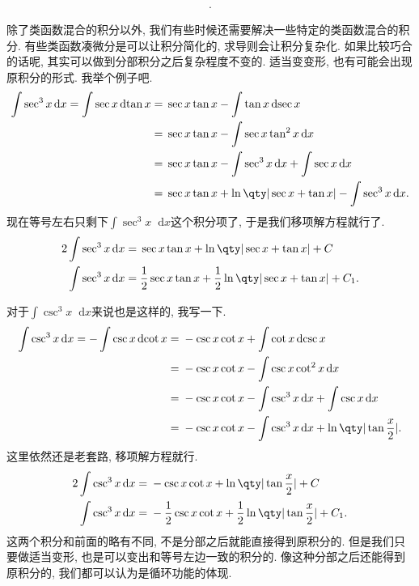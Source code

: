 \documentclass{ctexbook}
\newcommand*{\dif}{\mathop{}\!\mathrm{d}}
\begin{document}
{\begin{align*}
.\end{align*}\par
除了\uppercase\expandafter{}类函数混合的积分以外, 我们有些时候还需要解决一些特定的\uppercase\expandafter{}类函数混合的积分. 有些\uppercase\expandafter{}类函数凑微分是可以让积分简化的, 求导则会让积分复杂化. 如果比较巧合的话呢, 其实可以做到分部积分之后复杂程度不变的. 适当变变形, 也有可能会出现原积分的形式. 我举个例子吧. 
\begin{align*}
\int\sec^{3}{x}\dif{x}=\int\sec{x}\dif{\tan{x}}={}&\sec{x}\tan{x}-\int\tan{x}\dif{\sec{x}}\\
={}&\sec{x}\tan{x}-\int\sec{x}\tan^{2}{x}\dif{x}\\
={}&\sec{x}\tan{x}-\int\sec^{3}{x}\dif{x}+\int\sec{x}\dif{x}\\
={}&\sec{x}\tan{x}+\ln\qty|\sec{x}+\tan{x}|-\int\sec^{3}{x}\dif{x}
.\end{align*}
现在等号左右只剩下$\int\sec^{3}{x}\dif{x}$这个积分项了, 于是我们移项解方程就行了. 
\begin{align*}
2\int\sec^{3}{x}\dif{x}={}&\sec{x}\tan{x}+\ln\qty|\sec{x}+\tan{x}|+C\\
\int\sec^{3}{x}\dif{x}={}&\frac{1}{2}\sec{x}\tan{x}+\frac{1}{2}\ln\qty|\sec{x}+\tan{x}|+C_{1}
.\end{align*}\par
对于$\int\csc^{3}{x}\dif{x}$来说也是这样的, 我写一下. 
\begin{align*}
\int\csc^{3}{x}\dif{x}=-\int\csc{x}\dif{\cot{x}}={}&-\csc{x}\cot{x}+\int\cot{x}\dif{\csc{x}}\\
={}&-\csc{x}\cot{x}-\int\csc{x}\cot^{2}{x}\dif{x}\\
={}&-\csc{x}\cot{x}-\int\csc^{3}{x}\dif{x}+\int\csc{x}\dif{x}\\
={}&-\csc{x}\cot{x}-\int\csc^{3}{x}\dif{x}+\ln\qty|\tan{\frac{x}{2}}|
.\end{align*}
这里依然还是老套路, 移项解方程就行. 
\begin{align*}
2\int\csc^{3}{x}\dif{x}={}&-\csc{x}\cot{x}+\ln\qty|\tan{\frac{x}{2}}|+C\\
\int\csc^{3}{x}\dif{x}={}&-\frac{1}{2}\csc{x}\cot{x}+\frac{1}{2}\ln\qty|\tan{\frac{x}{2}}|+C_{1}
.\end{align*}
这两个积分和前面的略有不同, 不是分部之后就能直接得到原积分的. 但是我们只要做适当变形, 也是可以变出和等号左边一致的积分的. 像这种分部之后还能得到原积分的, 我们都可以认为是循环功能的体现. \par
}
\end{document}
